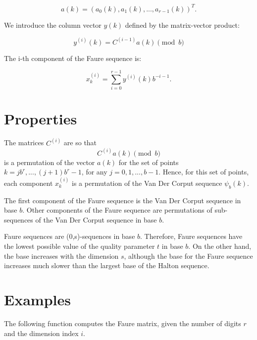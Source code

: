     
      $$
        a(k)=(a_0(k),a_1(k),...,a_{r-1}(k))^T.
      $$
    

    
      We introduce the column vector $y(k)$ defined by the matrix-vector product:
    

    
      $$
        y^{(i)}(k) = C^{(i-1)} a(k) \pmod b
      $$
    

    
      The i-th component of the Faure sequence is:
    

    
      $$
        x^{(i)}_k = \sum_{i=0}^{r-1} y^{(i)}(k)b^{-i-1}.
      $$
    

\section{Properties}

    
      The matrices $C^{(i)}$ are so that  
      $$
        C^{(i)} a(k) \pmod b
      $$
      is a permutation of the vector $a(k)$ for the set of points
      $k=jb^r,...,(j+1)b^r-1$, for any $j=0,1,...,b-1$.
      Hence, for this set of points, each component $x^{(i)}_k$ is a
      permutation of the Van Der Corput sequence $\psi_b(k)$.
    
      The first component of the Faure sequence is the Van Der Corput sequence
      in base $b$.
      Other components of the Faure sequence are permutations of sub-sequences
      of the Van Der Corput sequence in base $b$.
    

    
      Faure sequences are (0,s)-sequences in base $b$.
      Therefore, Faure sequences have the lowest possible value
      of the quality parameter $t$ in base $b$.
      On the other hand, the base increases with the dimension $s$,
      although the base for the Faure sequence increases much
      slower than the largest base of the Halton sequence.
    
\section{Examples}

    
      The following function computes the Faure matrix,
      given the number of digits $r$ and the dimension index $i$.
    

